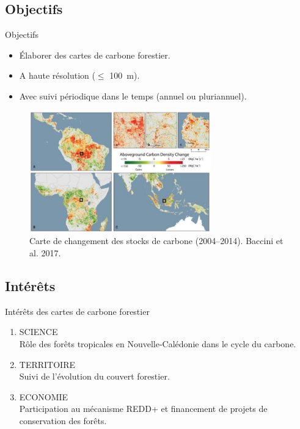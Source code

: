\documentclass[10pt,table,dvipsnames,compress]{beamer}
\begin{document}
\subsection{Objectifs}
\label{sec:orgb85d0f6}

\begin{frame}[label={sec:org8893962}]{Objectifs}
\begin{itemize}
\item Élaborer des cartes de carbone forestier.
\item A haute résolution (\(\leq\) 100 m).
\item Avec suivi périodique dans le temps (annuel ou pluriannuel).
\end{itemize}

\begin{figure}[htbp]
\centering
\includegraphics[width=0.7\textwidth]{figs/Baccini2017_Cchange.jpg}
\caption{Carte de changement des stocks de carbone (2004--2014). Baccini et al. 2017.}
\end{figure}
\end{frame}

\subsection{Intérêts}
\label{sec:orge15760b}

\begin{frame}[label={sec:org8cfb916}]{Intérêts des cartes de carbone forestier}
\begin{enumerate}
\item \alert{SCIENCE} \\
Rôle des forêts tropicales en Nouvelle-Calédonie dans le cycle du carbone.
\item \alert{TERRITOIRE} \\
Suivi de l'évolution du couvert forestier.
\item \alert{ECONOMIE} \\
Participation au mécanisme REDD+ et financement de projets de conservation des forêts.
\end{enumerate}
\end{frame}
\end{document}
